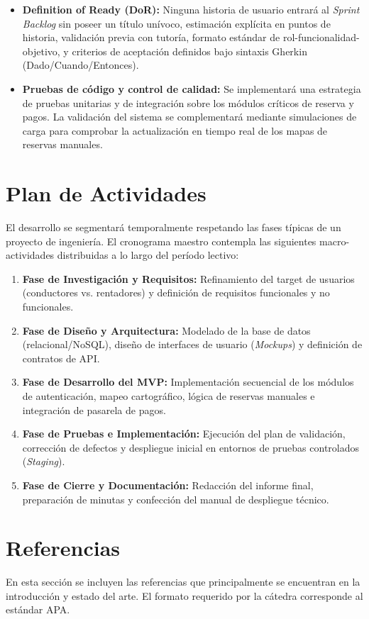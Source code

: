 \documentclass[11pt, a4paper]{article}
\begin{document}
\begin{itemize}
    \item \textbf{Definition of Ready (DoR):} Ninguna historia de usuario entrará al \textit{Sprint Backlog} sin poseer un título unívoco, estimación explícita en puntos de historia, validación previa con tutoría, formato estándar de rol-funcionalidad-objetivo, y criterios de aceptación definidos bajo sintaxis Gherkin (Dado/Cuando/Entonces).
    \item \textbf{Pruebas de código y control de calidad:} Se implementará una estrategia de pruebas unitarias y de integración sobre los módulos críticos de reserva y pagos. La validación del sistema se complementará mediante simulaciones de carga para comprobar la actualización en tiempo real de los mapas de reservas manuales.
\end{itemize}


\section{Plan de Actividades}
El desarrollo se segmentará temporalmente respetando las fases típicas de un proyecto de ingeniería. El cronograma maestro contempla las siguientes macro-actividades distribuidas a lo largo del período lectivo:

\begin{enumerate}
    \item \textbf{Fase de Investigación y Requisitos:} Refinamiento del target de usuarios (conductores vs. rentadores) y definición de requisitos funcionales y no funcionales.
    \item \textbf{Fase de Diseño y Arquitectura:} Modelado de la base de datos (relacional/NoSQL), diseño de interfaces de usuario (\textit{Mockups}) y definición de contratos de API.
    \item \textbf{Fase de Desarrollo del MVP:} Implementación secuencial de los módulos de autenticación, mapeo cartográfico, lógica de reservas manuales e integración de pasarela de pagos.
    \item \textbf{Fase de Pruebas e Implementación:} Ejecución del plan de validación, corrección de defectos y despliegue inicial en entornos de pruebas controlados (\textit{Staging}).
    \item \textbf{Fase de Cierre y Documentación:} Redacción del informe final, preparación de minutas y confección del manual de despliegue técnico.
\end{enumerate}


\section{Referencias}
En esta sección se incluyen las referencias que principalmente se encuentran en la introducción y estado del arte. El formato requerido por la cátedra corresponde al estándar APA.
\end{document}
